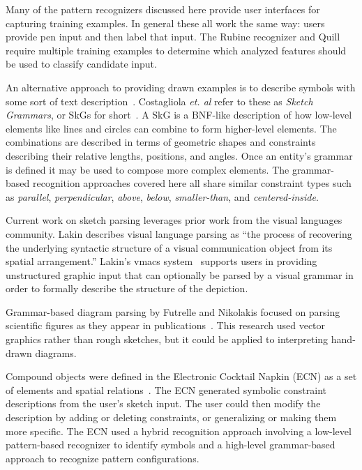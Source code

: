 Many of the pattern recognizers discussed here provide user interfaces
for capturing training examples. In general these all work the same
way: users provide pen input and then label that input. The Rubine
recognizer and Quill require multiple training examples to determine
which analyzed features should be used to classify candidate input.

An alternative approach to providing drawn examples is to describe
symbols with some sort of text
description~\cite{mas-graph-grammar}. Costagliola \textit{et. al}
refer to these as \textit{Sketch Grammars}, or SkGs for
short~\cite{costagliola-skg}. A SkG is a BNF-like description of how
low-level elements like lines and circles can combine to form
higher-level elements. The combinations are described in terms of
geometric shapes and constraints describing their relative lengths,
positions, and angles. Once an entity's grammar is defined it may be
used to compose more complex elements. The grammar-based recognition
approaches covered here all share similar constraint types such
as \textit{parallel}, \textit{perpendicular}, \textit{above},
\textit{below}, \textit{smaller-than}, and \textit{centered-inside}.

Current work on sketch parsing leverages prior work from the visual
languages community. Lakin describes visual language parsing as ``the
process of recovering the underlying syntactic structure of a visual
communication object from its spatial arrangement.'' Lakin's vmacs
system~\cite{lakin-vmacs-89} supports users in providing unstructured
graphic input that can optionally be parsed by a visual grammar in
order to formally describe the structure of the depiction.

Grammar-based diagram parsing by Futrelle and Nikolakis focused on
parsing scientific figures as they appear in
publications~\cite{futrelle-diagram-parsing}. This research used
vector graphics rather than rough sketches, but it could be applied to
interpreting hand-drawn diagrams.

Compound objects were defined in the Electronic Cocktail Napkin (ECN)
as a set of elements and spatial relations~\cite{gross-boe}. The ECN
generated symbolic constraint descriptions from the user's sketch
input. The user could then modify the description by adding or
deleting constraints, or generalizing or making them more
specific. The ECN used a hybrid recognition approach involving a
low-level pattern-based recognizer to identify symbols and a
high-level grammar-based approach to recognize pattern configurations.

